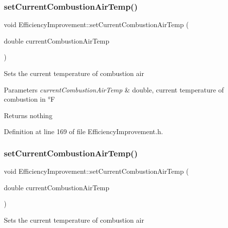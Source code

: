 \subsubsection{\texorpdfstring{set\+Current\+Combustion\+Air\+Temp()}{setCurrentCombustionAirTemp()}\hspace{0.1cm}{\footnotesize\ttfamily [2/3]}}
{\footnotesize\ttfamily void Efficiency\+Improvement\+::set\+Current\+Combustion\+Air\+Temp (\begin{DoxyParamCaption}\item[{double}]{current\+Combustion\+Air\+Temp }\end{DoxyParamCaption})\hspace{0.3cm}{\ttfamily [inline]}}

Sets the current temperature of combustion air


\begin{DoxyParams}{Parameters}
{\em current\+Combustion\+Air\+Temp} & double, current temperature of combustion in °F\\
\hline
\end{DoxyParams}
\begin{DoxyReturn}{Returns}
nothing 
\end{DoxyReturn}


Definition at line 169 of file Efficiency\+Improvement.\+h.

\mbox{\label{class_efficiency_improvement_a2fba09e47828dd8e6278251be8d1fa72}} 
\subsubsection{\texorpdfstring{set\+Current\+Combustion\+Air\+Temp()}{setCurrentCombustionAirTemp()}\hspace{0.1cm}{\footnotesize\ttfamily [3/3]}}
{\footnotesize\ttfamily void Efficiency\+Improvement\+::set\+Current\+Combustion\+Air\+Temp (\begin{DoxyParamCaption}\item[{double}]{current\+Combustion\+Air\+Temp }\end{DoxyParamCaption})\hspace{0.3cm}{\ttfamily [inline]}}

Sets the current temperature of combustion air


